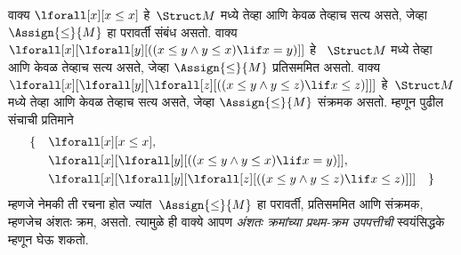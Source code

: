 \documentclass[../../../include/open-logic-section]{subfiles}
\begin{document}
\begin{ex}
वाक्य $\lforall[x][x \le x]$ हे~$\Struct M$ मध्ये तेव्हा आणि केवळ तेव्हाच
सत्य असते, जेव्हा $\Assign{\le}{M}$ हा परावर्ती संबंध असतो. वाक्य
$\lforall[x][\lforall[y][((x \le y \land y \le x) \lif x = y)]]$ हे
~$\Struct M$ मध्ये तेव्हा आणि केवळ तेव्हाच सत्य असते, जेव्हा
$\Assign{\le}{M}$ प्रतिसममित असतो. वाक्य
$\lforall[x][\lforall[y][\lforall[z][((x \le y \land y \le z)
      \lif x \le z)]]]$ हे~$\Struct M$ मध्ये तेव्हा आणि केवळ तेव्हाच सत्य
असते, जेव्हा $\Assign{\le}{M}$ संक्रमक असतो. म्हणून पुढील संचाची प्रतिमाने
\begin{align*}
\{\quad &\lforall[x][x \le x], \\
   & \lforall[x][\lforall[y][((x \le y \land y \le
    x) \lif x = y)]], \\
   &\lforall[x][\lforall[y][\lforall[z][((x \le y
      \land y \le z) \lif x \le z)]]] \quad \}
\end{align*}
म्हणजे नेमकी ती रचना होत ज्यांत~$\Assign{\le}{M}$ हा परावर्ती,
प्रतिसममित आणि संक्रमक, म्हणजेच अंशतः क्रम, असतो. त्यामुळे ही वाक्ये
आपण \emph{अंशतः क्रमांच्या प्रथम-क्रम उपपत्तीची} स्वयंसिद्धके म्हणून घेऊ
शकतो.
\end{ex}
\end{document}
